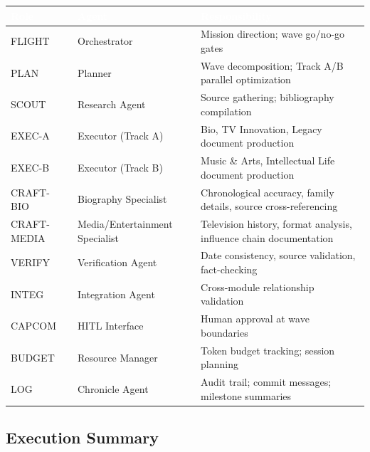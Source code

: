 \documentclass[11pt,letterpaper]{article}
\newcommand{\tableheader}[1]{\textbf{\sffamily\textcolor{white}{#1}}}
\begin{document}
\begin{center}
\begin{tabularx}{\textwidth}{L{2cm}L{3cm}X}
\toprule
{}
\tableheader{Role} & \tableheader{Agent} & \tableheader{Responsibility} \\
\midrule
FLIGHT & Orchestrator & Mission direction; wave go/no-go gates \\
PLAN & Planner & Wave decomposition; Track A/B parallel optimization \\
SCOUT & Research Agent & Source gathering; bibliography compilation \\
EXEC-A & Executor (Track A) & Bio, TV Innovation, Legacy document production \\
EXEC-B & Executor (Track B) & Music \& Arts, Intellectual Life document production \\
CRAFT-BIO & Biography Specialist & Chronological accuracy, family details, source cross-referencing \\
CRAFT-MEDIA & Media/Entertainment Specialist & Television history, format analysis, influence chain documentation \\
VERIFY & Verification Agent & Date consistency, source validation, fact-checking \\
INTEG & Integration Agent & Cross-module relationship validation \\
CAPCOM & HITL Interface & Human approval at wave boundaries \\
BUDGET & Resource Manager & Token budget tracking; session planning \\
LOG & Chronicle Agent & Audit trail; commit messages; milestone summaries \\
\bottomrule
\end{tabularx}
\end{center}

\subsection{Execution Summary}
\end{document}
